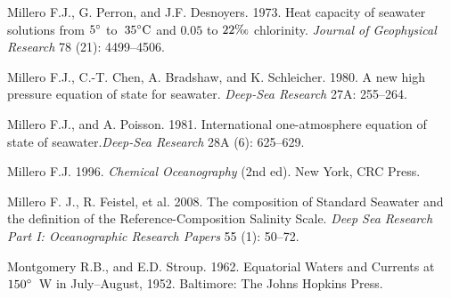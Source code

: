 \begin{thebibliography}{999}
Millero F.J., G. Perron, and J.F. Desnoyers.  1973. Heat capacity of
seawater solutions from $\degrees{5}$ to~$\degCent{35}$ and $0.05$ to
$22\ppt$ chlorinity. \textit{Journal of Geophysical Research} 78 (21):
4499--4506.
%

Millero F.J., C.-T. Chen, A. Bradshaw, and K. Schleicher. 1980. A new
high pressure equation of state for seawater. \textit{Deep-Sea
  Research} 27A: 255--264.
%

Millero F.J., and A. Poisson.  1981. International one-atmosphere
equation of state of seawater.\textit{Deep-Sea Research} 28A (6):
625--629.
%

Millero F.J.  1996. \textit{Chemical Oceanography} (2nd ed). New York,
CRC Press.
%

Millero F. J., R. Feistel, et al.  2008. The composition of Standard
Seawater and the definition of the Reference-Composition Salinity
Scale. \textit{Deep Sea Research Part I: Oceanographic Research
  Papers} 55 (1): 50--72.
%

Montgomery R.B., and E.D. Stroup.  1962. Equatorial Waters and
Currents at $\degrees{150}$~W in July--August, 1952. Baltimore: The
Johns Hopkins Press.
%


\end{thebibliography}
